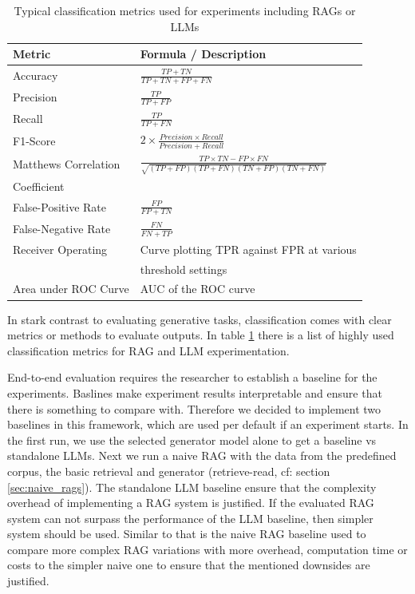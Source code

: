 {\renewcommand{\arraystretch}{1.5}%
\begin{table}
  \centering
 \begin{tabular}{|l|l|}
  \hline
  \textbf{Metric} & \textbf{Formula / Description} \\[3pt]
  \hline Accuracy & $\frac{TP + TN}{TP + TN + FP + FN}$\\[5pt]
  \hline Precision & $\frac{TP}{TP + FP}$\\[5pt]
  \hline Recall & $\frac{TP}{TP + FN}$\\[2pt]
  \hline F1-Score & $2 \times \frac{Precision \times Recall}{Precision + Recall}$\\[2pt]
  \hline Matthews Correlation & $\frac{TP \times TN - FP \times FN}{\sqrt{(TP + FP)(TP + FN)(TN + FP)(TN + FN)}}$\\Coefficient & \\[2pt]
  \hline False-Positive Rate & $\frac{FP}{FP + TN}$\\[2pt]
  \hline False-Negative Rate & $\frac{FN}{FN + TP}$\\[2pt]
  \hline Receiver Operating & Curve plotting TPR against FPR at various \\&threshold settings\\[2pt]
  \hline Area under ROC Curve &  AUC of the ROC curve\\[2pt]
  \hline
 \end{tabular}
 \caption{Typical classification metrics used for experiments including RAGs or LLMs\cite{Hou.8212023,Zeng.28.03.2024}}
 \label{table:classification_metrics}
\end{table}}

In stark contrast to evaluating generative tasks, classification comes with clear metrics or methods to evaluate outputs. In table \ref{table:classification_metrics} there is a list of highly used classification metrics for RAG and LLM experimentation.\cite{Hou.8212023,Zeng.28.03.2024} 

End-to-end evaluation requires the researcher to establish a baseline for the experiments. Baslines make experiment results interpretable and ensure that there is something to compare with. Therefore we decided to implement two baselines in this framework, which are used per default if an experiment starts. In the first run, we use the selected generator model alone to get a baseline vs standalone LLMs. Next we run a naive RAG with the data from the predefined corpus, the basic retrieval and generator (retrieve-read, cf: section \ref{sec:naive_rags}). The standalone LLM baseline ensure that the complexity overhead of implementing a RAG system is justified. If the evaluated RAG system can not surpass the performance of the LLM baseline, then simpler system should be used. Similar to that is the naive RAG baseline used to compare more complex RAG variations with more overhead, computation time or costs to the simpler naive one to ensure that the mentioned downsides are justified. 

